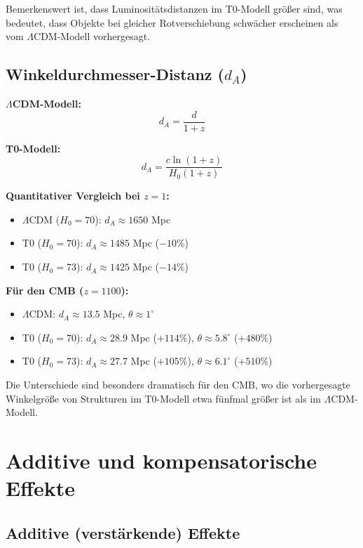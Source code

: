 \documentclass[a4paper,12pt]{article}
\theoremstyle{definition}
\theoremstyle{remark}
\begin{document}
	Bemerkenswert ist, dass Luminositätsdistanzen im T0-Modell größer sind, was bedeutet, dass Objekte bei gleicher Rotverschiebung schwächer erscheinen als vom \(\Lambda\)CDM-Modell vorhergesagt.
	
	\subsection{Winkeldurchmesser-Distanz ($d_A$)}
	
	\textbf{\(\Lambda\)CDM-Modell:}
	\begin{equation}
		d_A = \frac{d}{1 + z}
	\end{equation}
	
	\textbf{T0-Modell:}
	\begin{equation}
		d_A = \frac{c \ln(1 + z)}{H_0 (1 + z)}
	\end{equation}
	
	\textbf{Quantitativer Vergleich bei $z = 1$:}
	\begin{itemize}
		\item \(\Lambda\)CDM ($H_0 = 70$): $d_A \approx 1650$ Mpc
		\item T0 ($H_0 = 70$): $d_A \approx 1485$ Mpc ($-10\%$)
		\item T0 ($H_0 = 73$): $d_A \approx 1425$ Mpc ($-14\%$)
	\end{itemize}
	
	\textbf{Für den CMB ($z = 1100$):}
	\begin{itemize}
		\item \(\Lambda\)CDM: $d_A \approx 13.5$ Mpc, $\theta \approx 1^\circ$
		\item T0 ($H_0 = 70$): $d_A \approx 28.9$ Mpc ($+114\%$), $\theta \approx 5.8^\circ$ ($+480\%$)
		\item T0 ($H_0 = 73$): $d_A \approx 27.7$ Mpc ($+105\%$), $\theta \approx 6.1^\circ$ ($+510\%$)
	\end{itemize}
	
	Die Unterschiede sind besonders dramatisch für den CMB, wo die vorhergesagte Winkelgröße von Strukturen im T0-Modell etwa fünfmal größer ist als im \(\Lambda\)CDM-Modell.
	
	\section{Additive und kompensatorische Effekte}
	
	\subsection{Additive (verstärkende) Effekte}
	
\end{document}
